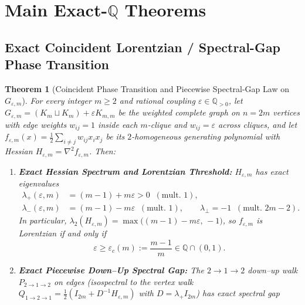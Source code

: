 \documentclass[11pt,a4paper]{article}
\newtheorem{theorem}{Theorem}[section]
\theoremstyle{definition}
\theoremstyle{remark}
\newcommand{\QQ}{\mathbb{Q}}
\begin{document}
\section{Main Exact-\texorpdfstring{$\QQ$}{Q} Theorems}\label{sec:results}

\subsection{Exact Coincident Lorentzian / Spectral-Gap Phase Transition}

\begin{theorem}[Coincident Phase Transition and Piecewise Spectral-Gap Law on $G_{\varepsilon,m}$]\label{thm:phase}
For every integer $m \ge 2$ and rational coupling $\varepsilon \in \QQ_{>0}$, let $G_{\varepsilon,m} = (K_m \sqcup K_m) + \varepsilon K_{m,m}$ be the weighted complete graph on $n = 2m$ vertices with edge weights $w_{ij} = 1$ inside each $m$-clique and $w_{ij} = \varepsilon$ across cliques, and let $f_{\varepsilon,m}(x) = \frac{1}{2}\sum_{i\neq j} w_{ij} x_i x_j$ be its $2$-homogeneous generating polynomial with Hessian $H_{\varepsilon,m} = \nabla^2 f_{\varepsilon,m}$. Then:
\begin{enumerate}[leftmargin=1.8em,itemsep=2pt]
  \item \textbf{Exact Hessian Spectrum and Lorentzian Threshold:} $H_{\varepsilon,m}$ has exact eigenvalues
  \begin{equation}
  \begin{aligned}
    \lambda_+(\varepsilon, m) &= (m-1) + m\varepsilon > 0 \;\;(\text{mult.\ } 1), \\
    \lambda_-(\varepsilon, m) &= (m-1) - m\varepsilon \;\;(\text{mult.\ } 1), \qquad
    \lambda_\perp = -1 \;\;(\text{mult.\ } 2m-2).
  \end{aligned}
  \end{equation}
  In particular, $\lambda_2(H_{\varepsilon,m}) = \max\bigl((m-1)-m\varepsilon,\,-1\bigr)$, so $f_{\varepsilon,m}$ is Lorentzian if and only if
  \begin{equation}\label{eq:eps-crit}
    \varepsilon \ge \varepsilon_c(m) := \frac{m-1}{m} \in \QQ \cap (0, 1).
  \end{equation}
  \item \textbf{Exact Piecewise Down--Up Spectral Gap:} The $2 \to 1 \to 2$ down--up walk $P_{2\to 1\to 2}$ on edges (isospectral to the vertex walk $Q_{1\to 2\to 1} = \frac{1}{2}(I_{2m} + D^{-1}H_{\varepsilon,m})$ with $D = \lambda_+ I_{2m}$) has exact spectral gap
  \begin{equation}\label{eq:piecewise-gap}

\end{equation}
\end{enumerate}
\end{theorem}
\end{document}

